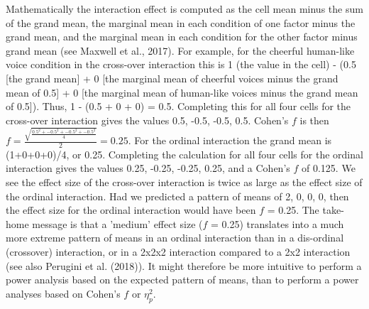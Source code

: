 \documentclass[
  english,
  ,jou,floatsintext]{apa6}
\begin{document}
\begin{tcolorbox}[colback=black!5!white,colframe=white!5!black,title=Box 3. Calculating effect sizes for interactions]
Mathematically the interaction effect is computed as the cell mean minus the sum of the grand mean, the marginal mean in each condition of one factor minus the grand mean, and the marginal mean in each condition for the other factor minus grand mean (see Maxwell et al., 2017). For example, for the cheerful human-like voice condition in the cross-over interaction this is 1 (the value in the cell) - (0.5 [the grand mean] + 0 [the marginal mean of cheerful voices minus the grand mean of 0.5] + 0 [the marginal mean of human-like voices minus the grand mean of 0.5]). 
Thus, 1 - (0.5 + 0 + 0) = 0.5.
Completing this for all four cells for the cross-over interaction gives the values 0.5, -0.5, -0.5, 0.5.
Cohen's $f$ is then $f = \frac { \sqrt { \frac { 0.5^2 +-0.5^2 + -0.5^2 + -0.5^2 } { 4 } }}{ 2 } = 0.25$.
For the ordinal interaction the grand mean is (1+0+0+0)/4, or 0.25.
Completing the calculation for all four cells for the ordinal interaction gives the values 0.25, -0.25, -0.25, 0.25, and a Cohen's $f$ of 0.125. 
We see the effect size of the cross-over interaction is twice as large as the effect size of the ordinal interaction. 
Had we predicted a pattern of means of 2, 0, 0, 0, then the effect size for the ordinal interaction would have been $f$ = 0.25. 
The take-home message is that a 'medium' effect size ($f$ = 0.25) translates into a much more extreme pattern of means in an ordinal interaction than in a dis-ordinal (crossover) interaction, or in a 2x2x2 interaction compared to a 2x2 interaction (see also Perugini et al. (2018)).
It might therefore be more intuitive to perform a power analysis based on the expected pattern of means, than to perform a power analyses based on Cohen's $f$ or $\eta_p^2$.
\end{tcolorbox}
\end{document}
